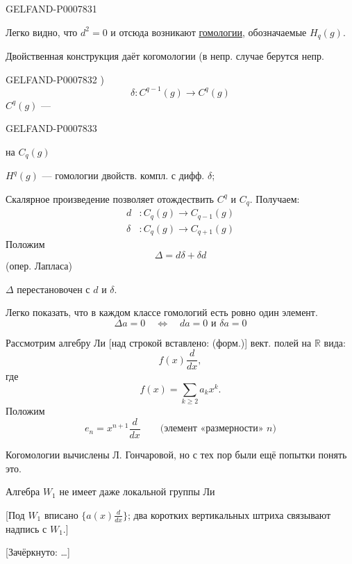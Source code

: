 \begin{GelfandAdjacentEvidence}{GELFAND-P000783}{1}

Легко видно, что \(d^2=0\) и отсюда возникают \underline{гомологии},
обозначаемые \(H_q(g)\).

Двойственная конструкция даёт когомологии (в непр. случае берутся непр.
\end{GelfandAdjacentEvidence}
\begin{GelfandAdjacentEvidence}{GELFAND-P000783}{2}
)
\begin{equation}
\delta:C^{q-1}(g)\longrightarrow C^q(g)\tag{2}
\end{equation}
\(C^q(g)\) ---
\end{GelfandAdjacentEvidence}
\begin{GelfandAdjacentEvidence}{GELFAND-P000783}{3}

на \(C_q(g)\)

\(H^q(g)\) --- гомологии двойств. компл. с дифф. \(\delta\);

Скалярное произведение позволяет отождествить \(C^q\) и \(C_q\). Получаем:
\begin{align*}
d &: C_q(g)\longrightarrow C_{q-1}(g)\\
\delta &: C_q(g)\longrightarrow C_{q+1}(g)
\end{align*}
Положим
\begin{equation}
\Delta=d\delta+\delta d\tag{3}
\end{equation}
(опер. Лапласа)

\(\Delta\) перестановочен с \(d\) и \(\delta\).

Легко показать, что в каждом классе гомологий есть ровно один  элемент.
\begin{equation}
\Delta a=0\quad\Longleftrightarrow\quad da=0\text{ и }\delta a=0\tag{4}
\end{equation}

Рассмотрим алгебру Ли [над строкой вставлено: (форм.)] вект. полей на \(\mathbb R\) вида:
\begin{equation}
f(x)\frac{d}{dx},\tag{5}
\end{equation}
где
\begin{equation}
f(x)=\sum_{k\geq2}a_kx^k.\tag{6}
\end{equation}
Положим
\[
e_n=x^{n+1}\frac{d}{dx}
\qquad\text{(элемент «размерности» \(n\))}
\]

Когомологии вычислены Л. Гончаровой, но с тех пор были ещё попытки понять это.

Алгебра \(W_1\) не имеет даже локальной группы Ли

[Под \(W_1\) вписано \(\{a(x)\tfrac{d}{dx}\}\);
два коротких вертикальных штриха связывают надпись с \(W_1\).]

[Зачёркнуто: …]
\end{GelfandAdjacentEvidence}
